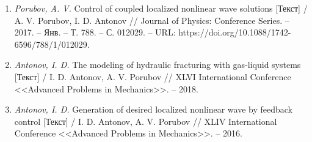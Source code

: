 \begin{enumerate}
\item \textit{Porubov, A. V.} Control of coupled localized nonlinear wave solutions [Текст] / A. V. Porubov, I. D. Antonov // Journal of Physics: Conference Series. -- 2017. -- Янв. -- Т. 788. -- С. 012029. -- URL: https://doi.org/10.1088/1742-6596/788/1/012029.

\item \textit{Antonov, I. D.} The modeling of hydraulic fracturing with gas-liquid systems [Текст] / I. D. Antonov, A. V. Porubov // XLVI International Conference <<Advanced Problems in Mechanics>>. -- 2018.

\item \textit{Antonov, I. D.} Generation of desired localized nonlinear wave by feedback control [Текст] / I. D. Antonov, A. V. Porubov // XLIV International Conference <<Advanced Problems in Mechanics>>. -- 2016.

\end{enumerate}

\vspace{5pt}
